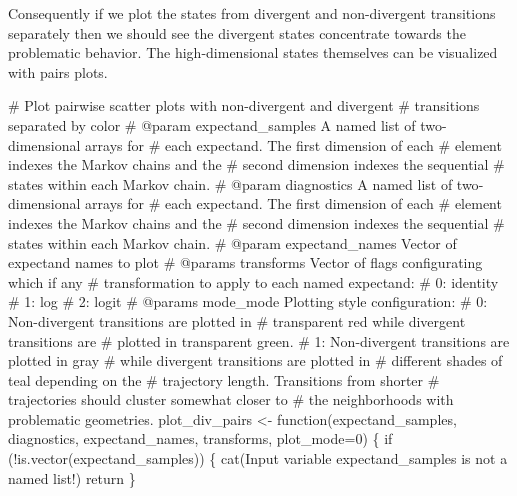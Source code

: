 \documentclass[
  letterpaper,
  DIV=11,
  numbers=noendperiod]{scrartcl}
\newenvironment{Shaded}{\begin{snugshade}}{\end{snugshade}}
\newcommand{\AttributeTok}[1]{\textcolor[rgb]{0.40,0.45,0.13}{#1}}
\newcommand{\CommentTok}[1]{\textcolor[rgb]{0.37,0.37,0.37}{#1}}
\newcommand{\ControlFlowTok}[1]{\textcolor[rgb]{0.00,0.23,0.31}{#1}}
\newcommand{\DecValTok}[1]{\textcolor[rgb]{0.68,0.00,0.00}{#1}}
\newcommand{\FunctionTok}[1]{\textcolor[rgb]{0.28,0.35,0.67}{#1}}
\newcommand{\NormalTok}[1]{\textcolor[rgb]{0.00,0.23,0.31}{#1}}
\newcommand{\OtherTok}[1]{\textcolor[rgb]{0.00,0.23,0.31}{#1}}
\newcommand{\SpecialCharTok}[1]{\textcolor[rgb]{0.37,0.37,0.37}{#1}}
\newcommand{\StringTok}[1]{\textcolor[rgb]{0.13,0.47,0.30}{#1}}
\begin{document}
Consequently if we plot the states from divergent and non-divergent
transitions separately then we should see the divergent states
concentrate towards the problematic behavior. The high-dimensional
states themselves can be visualized with pairs plots.

\begin{Shaded}
\begin{Highlighting}[]
\CommentTok{\# Plot pairwise scatter plots with non{-}divergent and divergent }
\CommentTok{\# transitions separated by color}
\CommentTok{\# @param expectand\_samples A named list of two{-}dimensional arrays for }
\CommentTok{\#                          each expectand.  The first dimension of each}
\CommentTok{\#                          element indexes the Markov chains and the }
\CommentTok{\#                          second dimension indexes the sequential }
\CommentTok{\#                          states within each Markov chain.}
\CommentTok{\# @param diagnostics A named list of two{-}dimensional arrays for }
\CommentTok{\#                    each expectand.  The first dimension of each}
\CommentTok{\#                    element indexes the Markov chains and the }
\CommentTok{\#                    second dimension indexes the sequential }
\CommentTok{\#                    states within each Markov chain.}
\CommentTok{\# @param expectand\_names Vector of expectand names to plot}
\CommentTok{\# @params transforms Vector of flags configurating which if any}
\CommentTok{\#                    transformation to apply to each named expectand:}
\CommentTok{\#                      0: identity}
\CommentTok{\#                      1: log}
\CommentTok{\#                      2: logit}
\CommentTok{\# @params mode\_mode Plotting style configuration: }
\CommentTok{\#                     0: Non{-}divergent transitions are plotted in }
\CommentTok{\#                        transparent red while divergent transitions are}
\CommentTok{\#                        plotted in transparent green.}
\CommentTok{\#                     1: Non{-}divergent transitions are plotted in gray }
\CommentTok{\#                        while divergent transitions are plotted in }
\CommentTok{\#                        different shades of teal depending on the }
\CommentTok{\#                        trajectory length.  Transitions from shorter}
\CommentTok{\#                        trajectories should cluster somewhat closer to }
\CommentTok{\#                        the neighborhoods with problematic geometries.}
\NormalTok{plot\_div\_pairs }\OtherTok{\textless{}{-}} \ControlFlowTok{function}\NormalTok{(expectand\_samples, diagnostics, }
\NormalTok{                           expectand\_names, transforms, }\AttributeTok{plot\_mode=}\DecValTok{0}\NormalTok{) \{}
  \ControlFlowTok{if}\NormalTok{ (}\SpecialCharTok{!}\FunctionTok{is.vector}\NormalTok{(expectand\_samples)) \{}
    \FunctionTok{cat}\NormalTok{(}\StringTok{\textquotesingle{}Input variable \textasciigrave{}expectand\_samples\textasciigrave{} is not a named list!\textquotesingle{}}\NormalTok{)}
\NormalTok{    return}
\NormalTok{  \}}
   

\end{Highlighting}
\end{Shaded}
\end{document}
